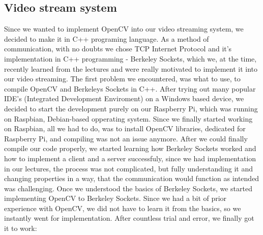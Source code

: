 \documentclass[conference]{IEEEtran}
\begin{document}
\subsection{Video stream system}
Since we wanted to implement OpenCV into our video streaming system, we decided to make it in C++ programing language. As a method of communication, with no doubts we chose TCP Internet Protocol and it's implementation in C++ programming - Berkeley Sockets, which we, at the time, recently learned from the lectures and were really motivated to implement it into our video streaming.
\newline
The first problem we encountered, was what to use, to compile OpenCV and Berkeleys Sockets in C++. After trying out many popular IDE's (Integrated Development Enviroment) on a Windows based device, we decided to start the development purely on our Raspberry Pi, which was running on Raspbian, Debian-based opperating system. Since we finally started working on Raspbian, all we had to do, was to install OpenCV libraries, dedicated for Raspberry Pi, and compiling was not an issue anymore. After we could finally compile our code properly, we started learning how Berkeley Sockets worked and how to implement a client and a server successfuly, since we had implementation in our lectures, the process was not complicated, but fully understanding it and changing properties in a way, that the communication would function as intended was challenging. Once we understood the basics of Berkeley Sockets, we started implementing OpenCV to Berkeley Sockets. Since we had a bit of prior experience with OpenCV, we did not have to learn it from the basics, so we instantly went for implementation. After countless trial and error, we finally got it to work:
\end{document}
